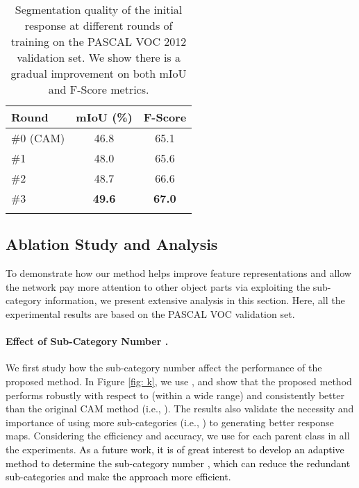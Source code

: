 \documentclass[10pt,twocolumn,letterpaper]{article}
\begin{document}
\begin{table}[!t]
	\caption{Segmentation quality of the initial response at different rounds of training on the PASCAL VOC 2012 validation set. We show there is a gradual improvement on both mIoU and F-Score metrics.}
	\vspace{-2mm}
	\small
	\centering
	\renewcommand{\arraystretch}{1.1}
	\setlength{\tabcolsep}{6pt}
	\begin{tabular}{lcc}
		\toprule
		Round & mIoU (\%)  & F-Score  \\
		\midrule
	
		\#0 (CAM) & 46.8 & 65.1 \\
		\#1 & 48.0 & 65.6 \\
		\#2 & 48.7 & 66.6 \\
		\#3 & \textbf{49.6} & \textbf{67.0} \\
		
		\bottomrule
	\label{table: iter_improve}
	\end{tabular}
	\vspace{-5mm}
\end{table}

\subsection{Ablation Study and Analysis}
To demonstrate how our method helps improve feature representations and allow the network pay more attention to other object parts via exploiting the sub-category information, we present extensive analysis in this section.
Here, all the experimental results are based on the PASCAL VOC validation set.

\vspace{-2mm}
\paragraph{Effect of Sub-Category Number .}
We first study how the sub-category number   affect the performance of the proposed method. 
In Figure \ref{fig: k}, we use , and show that the proposed method performs robustly with respect to  (within a wide range) and consistently better than the original CAM method (i.e., ).
The results also validate the necessity and importance of using more sub-categories (i.e., ) to generating better response maps. 
Considering the efficiency and accuracy, we use  for each parent class in all the experiments.
\textcolor{black}{As a future work, it is of great interest to develop an adaptive method to determine the sub-category number \cite{sarfraz2019efficient}, which can reduce the redundant sub-categories and make the approach more efficient.}
\end{document}
